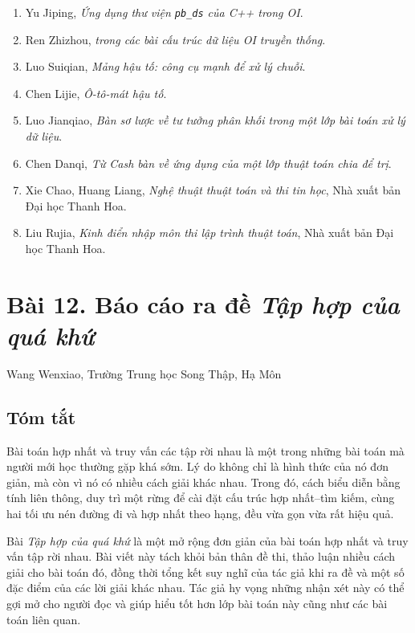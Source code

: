 \documentclass[11pt]{article}
\begin{document}
\begin{enumerate}
  \item Yu Jiping, \emph{Ứng dụng thư viện \texttt{pb\_ds} của C++ trong OI}.
  \item Ren Zhizhou, \emph{ trong các bài cấu trúc dữ liệu OI
  truyền thống}.
  \item Luo Suiqian, \emph{Mảng hậu tố: công cụ mạnh để xử lý chuỗi}.
  \item Chen Lijie, \emph{Ô-tô-mát hậu tố}.
  \item Luo Jianqiao, \emph{Bàn sơ lược về tư tưởng phân khối trong một lớp
  bài toán xử lý dữ liệu}.
  \item Chen Danqi, \emph{Từ \emph{Cash} bàn về ứng dụng của một lớp thuật
  toán chia để trị}.
  \item Xie Chao, Huang Liang, \emph{Nghệ thuật thuật toán và thi tin học},
  Nhà xuất bản Đại học Thanh Hoa.
  \item Liu Rujia, \emph{Kinh điển nhập môn thi lập trình thuật toán}, Nhà
  xuất bản Đại học Thanh Hoa.
\end{enumerate}

\section*{Bài 12. Báo cáo ra đề \emph{Tập hợp của quá khứ}}

\begin{center}
Wang Wenxiao, Trường Trung học Song Thập, Hạ Môn
\end{center}

\subsection*{Tóm tắt}

Bài toán hợp nhất và truy vấn các tập rời nhau là một trong những bài toán mà
người mới học thường gặp khá sớm. Lý do không chỉ là hình thức của nó đơn
giản, mà còn vì nó có nhiều cách giải khác nhau. Trong đó, cách biểu diễn bằng
tính liên thông, duy trì một rừng để cài đặt cấu trúc hợp nhất--tìm kiếm, cùng
hai tối ưu nén đường đi và hợp nhất theo hạng, đều vừa gọn vừa rất hiệu quả.

Bài \emph{Tập hợp của quá khứ} là một mở rộng đơn giản của bài toán hợp nhất
và truy vấn tập rời nhau. Bài viết này tách khỏi bản thân đề thi, thảo luận
nhiều cách giải cho bài toán đó, đồng thời tổng kết suy nghĩ của tác giả khi
ra đề và một số đặc điểm của các lời giải khác nhau. Tác giả hy vọng những
nhận xét này có thể gợi mở cho người đọc và giúp hiểu tốt hơn lớp bài toán
này cũng như các bài toán liên quan.
\end{document}

